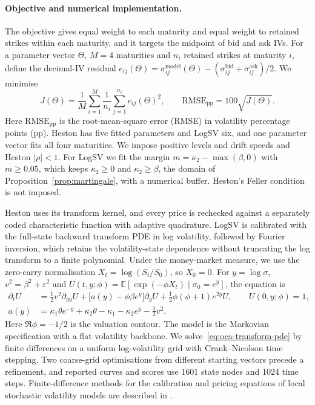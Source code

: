 \documentclass[11pt,a4paper]{article}
\theoremstyle{definition}
\theoremstyle{remark}
\newcommand{\E}{\mathbb{E}}
\begin{document}
\paragraph{Objective and numerical implementation.}
The objective gives equal weight to each maturity and equal weight to retained
strikes within each maturity, and it targets the midpoint of bid and ask IVs.
For a parameter vector $\Theta$, $M=4$ maturities and $n_i$ retained strikes at maturity
$i$, define the decimal-IV residual
$e_{ij}(\Theta)=\sigma^{\mathrm{model}}_{ij}(\Theta)
-(\sigma^{\mathrm{bid}}_{ij}+\sigma^{\mathrm{ask}}_{ij})/2$. We minimise
\begin{equation}
 J(\Theta)=\frac{1}{M}\sum_{i=1}^{M}\frac{1}{n_i}\sum_{j=1}^{n_i}e_{ij}(\Theta)^2,
 \qquad \mathrm{RMSE}_{\mathrm{pp}}=100\sqrt{J(\Theta)}.
 \label{eq:oca-calibration-objective}
\end{equation}
Here $\mathrm{RMSE}_{\mathrm{pp}}$ is the root-mean-square error (RMSE) in volatility
percentage points (pp). Heston has five fitted parameters and LogSV six, and one
parameter vector fits all four maturities. We impose positive levels and drift
speeds and Heston $|\rho|<1$. For LogSV we fit the margin
$m=\kappa_2-\max(\beta,0)$ with $m\geq0.05$, which keeps $\kappa_2\geq0$ and
$\kappa_2\geq\beta$, the domain of Proposition~\ref{prop:martingale}, with a
numerical buffer. Heston's Feller condition is not imposed.

Heston uses its transform kernel, and every price is rechecked against a separately
coded characteristic function with adaptive quadrature. LogSV is calibrated with
the full-state backward transform PDE in log volatility, followed by Fourier
inversion, which retains the volatility-state dependence without truncating the
log transform to a finite polynomial.
Under the money-market measure, we use the
zero-carry normalisation $X_t=\log(S_t/S_0)$, so $X_0=0$.
For $y=\log\sigma$, $v^2=\beta^2+\varepsilon^2$ and
$U(t,y;\phi)=\E[\exp(-\phi X_t)\mid\sigma_0=e^y]$, the equation is
\begin{align}
 \partial_t U &= \tfrac12v^2\partial_{yy}U
   +\bigl[a(y)-\phi\beta e^y\bigr]\partial_yU
   +\tfrac12\phi(\phi+1)e^{2y}U, \qquad U(0,y;\phi)=1,
   \label{eq:oca-transform-pde}\\
 a(y)&=\kappa_1\theta e^{-y}+\kappa_2\theta-\kappa_1
       -\kappa_2e^y-\tfrac12v^2.\nonumber
\end{align}
Here $\Re\phi=-1/2$ is the valuation contour. The model is the Markovian specification
with a flat volatility backbone.
We solve~\eqref{eq:oca-transform-pde} by finite differences on a uniform log-volatility grid
with Crank--Nicolson time stepping. Two coarse-grid optimisations from different starting
vectors precede a refinement, and reported curves and scores use 1601 state nodes and 1024
time steps. Finite-difference methods for the calibration and pricing equations of local
stochastic volatility models are described in \citet{Sepp2011}.
\end{document}
